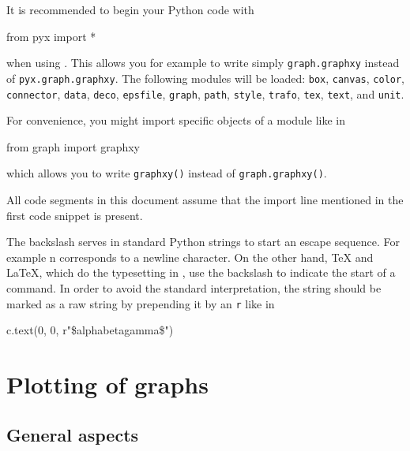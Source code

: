 \documentclass[11pt,DIV14]{scrartcl}
\begin{document}
{}
{It is recommended to begin your Python code with 
\begin{progcode}
from pyx import *
\end{progcode}
when using \PyX. This allows you for example to write simply 
\texttt{graph.graphxy}
instead of \texttt{pyx.graph.graphxy}. The following modules will be loaded:
\texttt{box}, \texttt{canvas}, \texttt{color}, \texttt{connector}, \texttt{data},
\texttt{deco}, \texttt{epsfile}, \texttt{graph}, \texttt{path},
\texttt{style}, \texttt{trafo}, \texttt{tex}, \texttt{text}, and
\texttt{unit}.

For convenience, you might import specific objects of a module like in
\begin{progcode}
from graph import graphxy
\end{progcode}
which allows you to write \texttt{graphxy()} instead of \texttt{graph.graphxy()}.

All code segments in this document assume that the import line mentioned in
the first code snippet is present.
}

{}
{\label{q:raw_string}
The backslash serves in standard Python strings to start an escape sequence.
For example {\cs n} corresponds to a newline character. On the other hand,
\TeX{} and \LaTeX{}, which do the typesetting in \PyX, use the backslash to
indicate the start of a command. In order to avoid the standard interpretation,
the string should be marked as a raw string by prepending it by an \texttt{r} 
like in
\begin{progcode}
c.text(0, 0, r"\${\cs alpha}{\cs beta}{\cs gamma}\$")
\end{progcode}
}

\section{Plotting of graphs}

\subsection{General aspects}
\end{document}
